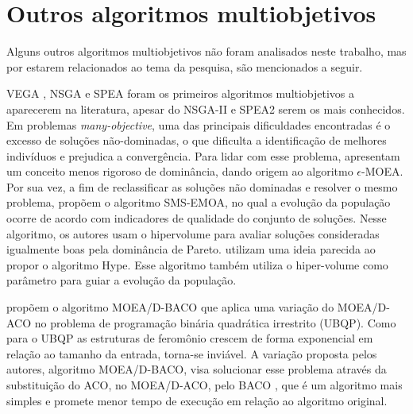 \section{Outros algoritmos multiobjetivos}
Alguns outros algoritmos multiobjetivos não foram analisados neste trabalho, mas por estarem relacionados ao tema da pesquisa, são mencionados a seguir.

\ac{VEGA} \cite{Schaffer1985}, \ac{NSGA} \cite{Srinivas1994} e \ac{SPEA} \cite{Zitzler1999} foram os primeiros algoritmos multiobjetivos a aparecerem na literatura, apesar do NSGA-II e SPEA2 serem os mais conhecidos. Em problemas \textit{many-objective}, uma das principais dificuldades encontradas é o excesso de soluções não-dominadas, o que dificulta a identificação de melhores indivíduos e prejudica a convergência. Para lidar com esse problema, \cite{Aguirre2009} apresentam um conceito menos rigoroso de dominância, dando origem ao algoritmo $\epsilon$-MOEA. Por sua vez, a fim de reclassificar as soluções não dominadas e resolver o mesmo problema, \cite{Beume2007} propõem o algoritmo SMS-EMOA, no qual a evolução da população ocorre de acordo com indicadores de qualidade do conjunto de soluções. Nesse algoritmo, os autores usam o hipervolume para avaliar soluções consideradas igualmente boas pela dominância de Pareto. \cite{Bader2011} utilizam uma ideia parecida ao propor o algoritmo Hype. Esse algoritmo também utiliza o hiper-volume como parâmetro para guiar a evolução da população. 



\cite{SouzaPozo2015} propõem o algoritmo MOEA/D-BACO que aplica uma variação do MOEA/D-ACO no problema de programação binária quadrática irrestrito (UBQP). Como para o UBQP as estruturas de feromônio crescem de forma exponencial em relação ao tamanho da entrada, torna-se inviável. A variação proposta pelos autores, algoritmo MOEA/D-BACO, visa solucionar esse problema através da substituição do ACO, no MOEA/D-ACO, pelo \ac{BACO} \cite{baco2006}, que é um algoritmo mais simples e promete menor tempo de execução em relação ao algoritmo original.